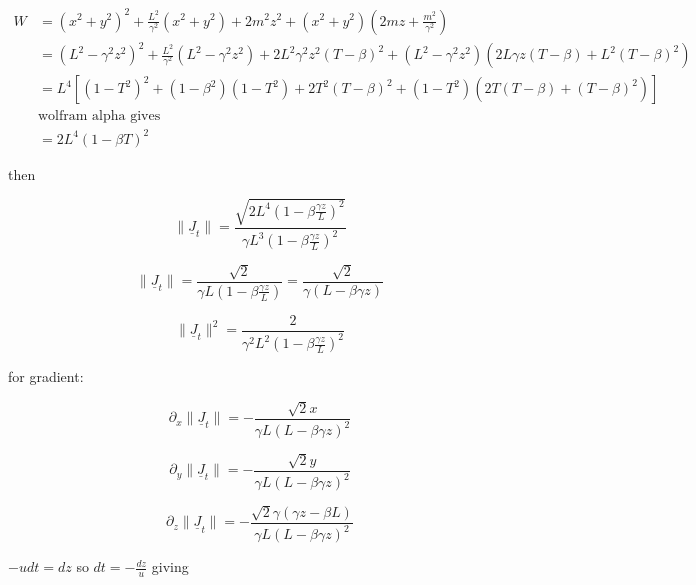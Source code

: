 \begin{equation}
	\begin{aligned}
		W &= (x^2+y^2)^2 + \frac{L^2}{\gamma^2}(x^2+y^2) +2m^2z^2 + (x^2+y^2)(2mz +\frac{m^2}{\gamma^2})
		\\
		&= (L^2 -\gamma^2z^2)^2 + \frac{L^2}{\gamma^2}(L^2 -\gamma^2z^2) +2 L^2 \gamma^2z^2 (T-\beta)^2 + (L^2 -\gamma^2z^2)(2 L \gamma z (T-\beta) + L^2 (T-\beta)^2) \\
		&= L^4 \left[ (1-T^2)^2 + (1-\beta^2)(1-T^2) +2T^2 (T-\beta)^2 + (1 - T^2)(2 T (T-\beta) + (T-\beta)^2)  \right]
		\\
		& \text{wolfram alpha gives} \\
		&= 2 L^4 (1- \beta T)^2
	\end{aligned}
\end{equation}

then

\begin{equation}
	\|\underline{J}_t\| = \frac{ \sqrt{ 2 L^4 (1- \beta \frac{\gamma z}{L})^2 }}{\gamma  L^3 ( 1 - \beta \frac{\gamma z}{L} )^2 }
\end{equation}

\begin{equation}
	\|\underline{J}_t\| = \frac{ \sqrt{2} }{\gamma  L ( 1 - \beta \frac{\gamma z}{L} ) } = \frac{ \sqrt{2} }{\gamma  ( L - \beta \gamma z ) }
\end{equation}

\begin{equation}
	\|\underline{J}_t\|^2 = \frac{ 2 }{\gamma^2  L^2 ( 1 - \beta \frac{\gamma z}{L} )^2 }
\end{equation}

for gradient:

\begin{equation}
	\partial_x \|\underline{J}_t\|  = - \frac{ \sqrt{2} x }{\gamma L ( L - \beta \gamma z )^2 }
\end{equation}

\begin{equation}
	\partial_y \|\underline{J}_t\|  = - \frac{ \sqrt{2} y }{\gamma L ( L - \beta \gamma z )^2 }
\end{equation}

\begin{equation}
	\partial_z \|\underline{J}_t\|  = - \frac{ \sqrt{2} \gamma (\gamma z - \beta L) }{\gamma L ( L - \beta \gamma z )^2 }
\end{equation}

$- u dt = dz $ so $dt = - \frac{dz}{u}$ giving

